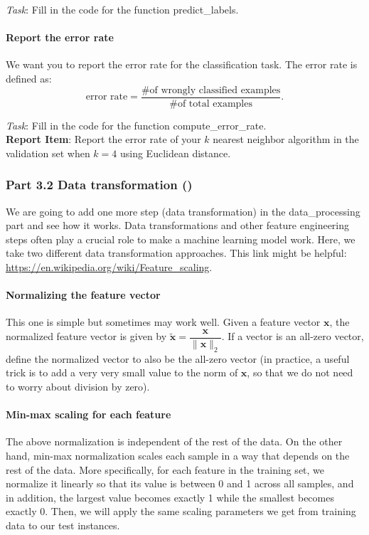 \noindent \emph{Task}: Fill in the code for the function \colorbox{Gainsboro!60!Lavender}{predict\_labels}.

\paragraph{Report the error rate}
We want you to report the error rate for the classification task. The error rate is defined as:
\begin{equation}
    \text{error rate} = \dfrac{\text{\# of wrongly classified examples}}{\text{\# of total examples}}.
\end{equation}

\noindent \emph{Task}: Fill in the code for the function \colorbox{Gainsboro!60!Lavender}{compute\_error\_rate}.\\

\noindent \textbf{Report Item}: Report the error rate of your $k$ nearest neighbor algorithm in the validation set when $k=4$ using Euclidean distance.


\subsubsection*{Part 3.2 Data transformation ()}
We are going to add one more step (data transformation) in the \colorbox{Gainsboro!60!Lavender}{data\_processing} part and see how it works. Data transformations and other feature engineering steps often play a crucial role to make a machine learning model work.  Here, we take two different data transformation approaches. This link might be helpful: \url{https://en.wikipedia.org/wiki/Feature_scaling}.

\paragraph{Normalizing the feature vector}
This one is simple but sometimes may work well. Given a feature vector $\mathbf{x}$, the normalized feature vector is given by $\mathbf{\tilde{x}}=\dfrac{\mathbf{x}}{\|\mathbf{x}\|_2}$. If a vector is an all-zero vector, define the normalized vector to also be the all-zero vector (in practice, a useful trick is to add a very very small value to the norm of $\mathbf{x}$, so that we do not need to worry about  division by zero).

\paragraph{Min-max scaling for each feature}
The above normalization is independent of the rest of the data. On the other hand, min-max normalization scales each sample in a way that depends on the rest of the data. More specifically, for each feature in the training set, we normalize it linearly so that its value is between 0 and 1 across all samples, and in addition, the largest value becomes exactly 1 while the smallest becomes exactly 0. Then, we will apply the same scaling parameters we get from training data to our test instances.\\

